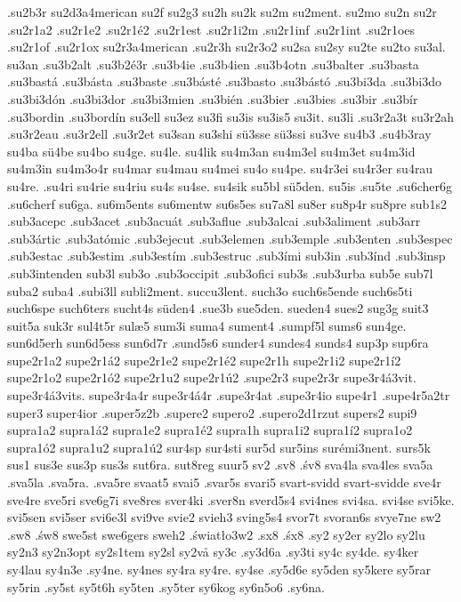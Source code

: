 {{.su2b3r
su2d3a4merican
su2f
su2g3
su2h
su2k
su2m
su2ment.
su2mo
su2n
su2r
.su2r1a2
.su2r1e2
.su2r1é2
.su2r1est
.su2r1i2m
.su2r1inf
.su2r1int
.su2r1oes
.su2r1of
.su2r1ox
su2r3a4merican
.su2r3h
su2r3o2
su2sa
su2sy
su2te
su2to
su3al.
su3an
.su3b2alt
.su3b2é3r
.su3b4ie
.su3b4ien
.su3b4otn
.su3balter
.su3basta
.su3bastá
.su3básta
.su3baste
.su3básté
.su3basto
.su3bástó
.su3bi3da
.su3bi3do
.su3bi3dón
.su3bi3dor
.su3bi3mien
.su3bién
.su3bier
.su3bies
.su3bir
.su3bír
.su3bordin
.su3bordín
su3ell
su3ez
su3fi
su3is
su3is5
su3it.
su3li
.su3r2a3t
su3r2ah
.su3r2eau
.su3r2ell
.su3r2et
su3san
su3shi
sü3sse
sü3ssi
su3ve
su4b3
.su4b3ray
su4ba
sü4be
su4bo
su4ge.
su4le.
su4lik
su4m3an
su4m3el
su4m3et
su4m3id
su4m3in
su4m3o4r
su4mar
su4mau
su4mei
su4o
su4pe.
su4r3ei
su4r3er
su4rau
su4re.
.su4ri
su4rie
su4riu
su4s
su4se.
su4sik
su5bl
sü5den.
su5is
.su5te
.su6cher6g
.su6cherf
su6ga.
su6m5ents
su6mentw
su6s5es
su7a8l
su8er
su8p4r
su8pre
sub1s2
.sub3acepc
.sub3acet
.sub3acuát
.sub3aflue
.sub3alcai
.sub3aliment
.sub3arr
.sub3ártic
.sub3atómic
.sub3ejecut
.sub3elemen
.sub3emple
.sub3enten
.sub3espec
.sub3estac
.sub3estim
.sub3estím
.sub3estruc
.sub3ími
sub3in
.sub3índ
.sub3insp
.sub3intenden
sub3l
sub3o
.sub3occipit
.sub3ofici
sub3s
.sub3urba
sub5e
sub7l
suba2
suba4
.subi3ll
subli2ment.
succu3lent.
such3o
such6s5ende
such6s5ti
such6spe
such6ters
sucht4s
süden4
.sue3b
sue5den.
sueden4
sues2
sug3g
suit3
suit5a
suk3r
sul4t5r
sulæ5
sum3i
suma4
sument4
.sumpf5l
sums6
sun4ge.
sun6d5erh
sun6d5ess
sun6d7r
.sund5s6
sunder4
sundes4
sunds4
sup3p
sup6ra
supe2r1a2
supe2r1á2
supe2r1e2
supe2r1é2
supe2r1h
supe2r1i2
supe2r1í2
supe2r1o2
supe2r1ó2
supe2r1u2
supe2r1ú2
.supe2r3
supe2r3r
supe3r4á3vit.
supe3r4á3vits.
supe3r4a4r
supe3r4á4r
.supe3r4at
.supe3r4io
supe4r1
.supe4r5a2tr
super3
super4ior
.super5z2b
.supere2
supero2
.supero2d1rzut
supers2
supi9
supra1a2
supra1á2
supra1e2
supra1é2
supra1h
supra1i2
supra1í2
supra1o2
supra1ó2
supra1u2
supra1ú2
sur4sp
sur4sti
sur5d
sur5ins
surémi3nent.
surs5k
sus1
sus3e
sus3p
sus3s
sut6ra.
sut8reg
suur5
sv2
.sv8
.śv8
sva4la
sva4les
sva5a
.sva5la
.sva5ra.
.sva5re
svaat5
svai5
.svar5s
svari5
svart-svidd
svart-svidde
sve4r
sve4re
sve5ri
sve6g7i
sve8res
sver4ki
.sver8n
sverd5s4
svi4nes
svi4sa.
svi4se
svi5ke.
svi5sen
svi5ser
svi6e3l
svi9ve
svie2
svieh3
sving5s4
svor7t
svoran6s
svye7ne
sw2
.sw8
.św8
swe5st
swe6gers
sweh2
.światło3w2
.sx8
.śx8
.sy2
sy2er
sy2lo
sy2lu
sy2n3
sy2n3opt
sy2s1tem
sy2sl
sy2vå
sy3c
.sy3d6a
.sy3ti
sy4c
sy4de.
sy4ker
sy4lau
sy4n3e
.sy4ne.
sy4nes
sy4ra
sy4re.
sy4se
.sy5d6e
sy5den
sy5kere
sy5rar
sy5rin
.sy5st
sy5t6h
sy5ten
.sy5ter
sy6kog
sy6n5o6
.sy6na.
}}
